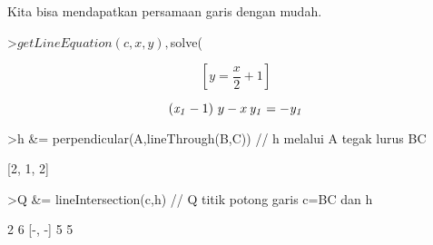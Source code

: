 \documentclass{article}
\begin{document}
\begin{eulernotebook}
\begin{euleroutput}
\end{euleroutput}
\begin{eulercomment}
Kita bisa mendapatkan persamaan garis dengan mudah.
\end{eulercomment}
\begin{eulerprompt}
>$getLineEquation(c,x,y), $solve(%
\end{eulerprompt}
\begin{eulerformula}
\[
\left[ y=\frac{x}{2}+1 \right] 
\]
\end{eulerformula}
\begin{eulerformula}
\[
\left({\it x_1}-1\right)\,y-x\,{\it y_1}=-{\it y_1}
\]
\end{eulerformula}
\begin{eulerprompt}
>h &= perpendicular(A,lineThrough(B,C)) // h melalui A tegak lurus BC
\end{eulerprompt}
\begin{euleroutput}
  
                                [2, 1, 2]
  
\end{euleroutput}
\begin{eulerprompt}
>Q &= lineIntersection(c,h) // Q titik potong garis c=BC dan h
\end{eulerprompt}
\begin{euleroutput}
  
                                   2  6
                                  [-, -]
                                   5  5
  

\end{euleroutput}
\end{eulernotebook}
\end{document}
